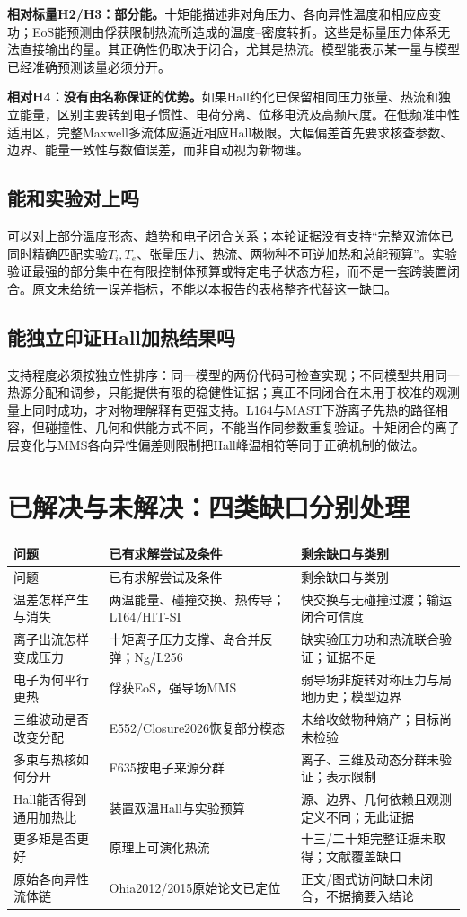 \textbf{相对标量H2/H3：部分能。}十矩能描述非对角压力、各向异性温度和相应应变功；EoS能预测由俘获限制热流所造成的温度--密度转折。这些是标量压力体系无法直接输出的量。其正确性仍取决于闭合，尤其是热流。模型能表示某一量与模型已经准确预测该量必须分开。

\textbf{相对H4：没有由名称保证的优势。}如果Hall约化已保留相同压力张量、热流和独立能量，区别主要转到电子惯性、电荷分离、位移电流及高频尺度。在低频准中性适用区，完整Maxwell多流体应逼近相应Hall极限。大幅偏差首先要求核查参数、边界、能量一致性与数值误差，而非自动视为新物理。

\subsection{能和实验对上吗}
可以对上部分温度形态、趋势和电子闭合关系；本轮证据没有支持“完整双流体已同时精确匹配实验$T_i,T_e$、张量压力、热流、两物种不可逆加热和总能预算”。实验验证最强的部分集中在有限控制体预算或特定电子状态方程，而不是一套跨装置闭合。原文未给统一误差指标，不能以本报告的表格整齐代替这一缺口。

\subsection{能独立印证Hall加热结果吗}
支持程度必须按独立性排序：同一模型的两份代码可检查实现；不同模型共用同一热源分配和调参，只能提供有限的稳健性证据；真正不同闭合在未用于校准的观测量上同时成功，才对物理解释有更强支持。L164与MAST下游离子先热的路径相容，但碰撞性、几何和供能方式不同，不能当作同参数重复验证。十矩闭合的离子层变化与MMS各向异性偏差则限制把Hall峰温相符等同于正确机制的做法。

\section{已解决与未解决：四类缺口分别处理}
\begin{longtable}{P{40mm}P{56mm}P{52mm}}
\toprule 问题 & 已有求解尝试及条件 & 剩余缺口与类别\\\midrule\endfirsthead
\toprule 问题 & 已有求解尝试及条件 & 剩余缺口与类别\\\midrule\endhead
温差怎样产生与消失 & 两温能量、碰撞交换、热传导；L164/HIT-SI & 快交换与无碰撞过渡；输运闭合可信度\\
离子出流怎样变成压力 & 十矩离子压力支撑、岛合并反弹；Ng/L256 & 缺实验压力功和热流联合验证；证据不足\\
电子为何平行更热 & 俘获EoS，强导场MMS & 弱导场非旋转对称压力与局地历史；模型边界\\
三维波动是否改变分配 & E552/Closure2026恢复部分模态 & 未给收敛物种熵产；目标尚未检验\\
多束与热核如何分开 & F635按电子来源分群 & 离子、三维及动态分群未验证；表示限制\\
Hall能否得到通用加热比 & 装置双温Hall与实验预算 & 源、边界、几何依赖且观测定义不同；无此证据\\
更多矩是否更好 & 原理上可演化热流 & 十三/二十矩完整证据未取得；文献覆盖缺口\\
原始各向异性流体链 & Ohia2012/2015原始论文已定位 & 正文/图式访问缺口未闭合，不据摘要入结论\\
\bottomrule\end{longtable}

